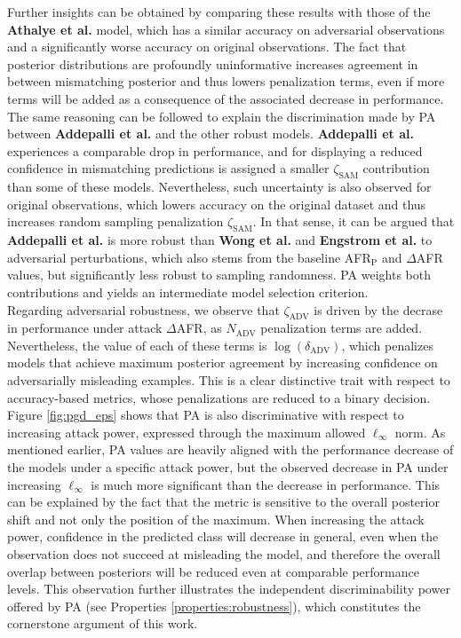 Further insights can be obtained by comparing these results
with those of the {\color{tab:green} \textbf{Athalye et al.}} model, which has a similar accuracy
on adversarial observations and a significantly worse accuracy on original observations. The fact that posterior
distributions are profoundly uninformative increases agreement in between mismatching posterior and
thus lowers penalization terms, even if more terms will be added as a consequence of the
associated decrease in performance. \\

The same reasoning can be followed to explain the discrimination made by PA between
{\color{tab:purple} \textbf{Addepalli et al.}} and the other robust models. {\color{tab:purple} \textbf{Addepalli et al.}}
experiences a comparable drop in performance, and for displaying a reduced confidence in mismatching predictions
is assigned a smaller $\zeta_{\text{SAM}}$ contribution than some of these models. Nevertheless, such 
uncertainty is also observed for original observations, which lowers accuracy on the original dataset 
and thus increases random sampling penalization $\zeta_{\text{SAM}}$. In that sense, it can be argued
that {\color{tab:purple} \textbf{Addepalli et al.}} is more robust than {\color{tab:red} \textbf{Wong et al.}}
and {\color{tab:blue} \textbf{Engstrom et al.}} to adversarial perturbations, which also stems from
the baseline AFR$_\text{P}$ and $\Delta$AFR values, but significantly less robust to sampling randomness.
PA weights both contributions and yields an intermediate model selection criterion. \\

Regarding adversarial robustness, we observe that $\zeta_{\text{ADV}}$ is driven by the decrase in 
performance under attack $\Delta$AFR, as $N_{\text{ADV}}$ penalization terms
are added. Nevertheless, the value of each of these terms is $\log(\delta_{\text{ADV}})$, which penalizes
models that achieve maximum posterior agreement by increasing confidence on adversarially
misleading examples. This is a clear distinctive trait with respect to accuracy-based metrics,
whose penalizations are reduced to a binary decision. \\

Figure \ref{fig:pgd_eps} shows that PA is also discriminative with respect to
increasing attack power, expressed through the maximum allowed $\ell_\infty$ norm. 
As mentioned earlier, PA values are heavily aligned with the performance
decrease of the models under a specific attack power, but the observed decrease in PA 
under increasing $\ell_\infty$ is much more significant than the decrease 
in performance. This can be explained by the fact that the metric is sensitive 
to the overall posterior shift and not only the position of the maximum. When increasing 
the attack power, confidence in the predicted class will decrease in general, 
even when the observation does not succeed at misleading the model, and therefore the
overall overlap between posteriors will be reduced even at comparable performance 
levels. This observation further illustrates the independent discriminability power
offered by PA (see Properties \ref{properties:robustness}), which constitutes the 
cornerstone argument of this work. \\

